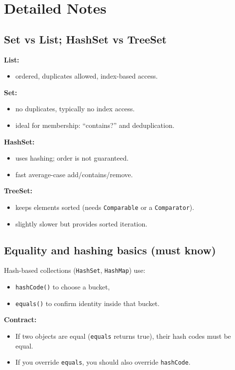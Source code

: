 \documentclass[11pt]{article}
\begin{document}
\section{Detailed Notes}
\subsection{Set vs List; HashSet vs TreeSet}
\textbf{List:}
\begin{itemize}
  \item ordered, duplicates allowed, index-based access.
\end{itemize}
\textbf{Set:}
\begin{itemize}
  \item no duplicates, typically no index access.
  \item ideal for membership: ``contains?'' and deduplication.
\end{itemize}

\textbf{HashSet:}
\begin{itemize}
  \item uses hashing; order is not guaranteed.
  \item fast average-case add/contains/remove.
\end{itemize}

\textbf{TreeSet:}
\begin{itemize}
  \item keeps elements sorted (needs \texttt{Comparable} or a \texttt{Comparator}).
  \item slightly slower but provides sorted iteration.
\end{itemize}

\subsection{Equality and hashing basics (must know)}
Hash-based collections (\texttt{HashSet}, \texttt{HashMap}) use:
\begin{itemize}
  \item \texttt{hashCode()} to choose a bucket,
  \item \texttt{equals()} to confirm identity inside that bucket.
\end{itemize}

\textbf{Contract:}
\begin{itemize}
  \item If two objects are equal (\texttt{equals} returns true), their hash codes must be equal.
  \item If you override \texttt{equals}, you should also override \texttt{hashCode}.
\end{itemize}
\end{document}
